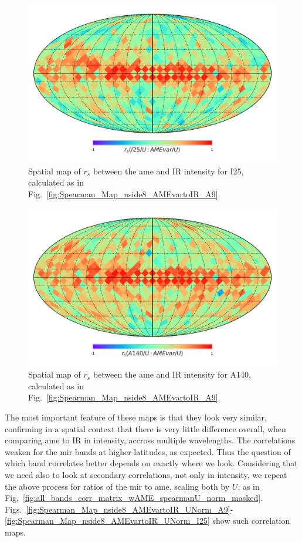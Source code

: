       \begin{figure}
        \includegraphics[width=\textwidth/2]{../Plots/Allsky_Corr/Spearman_Map_nside8_I25toAMEvar.pdf}
        \centering
        \caption{Spatial map of $r_{s}$ between the \gls{ame} and IR intensity for I25, calculated as in Fig.~\ref{fig:Spearman_Map_nside8_AMEvartoIR_A9}.}
        \label{fig:Spearman_Map_nside8_AMEvartoIR_I25}
      \end{figure}
      \begin{figure}
        \includegraphics[width=\textwidth/2]{../Plots/Allsky_Corr/Spearman_Map_nside8_A140toAMEvar.pdf}
        \centering
        \caption{Spatial map of $r_{s}$ between the \gls{ame} and IR intensity for A140, calculated as in Fig.~\ref{fig:Spearman_Map_nside8_AMEvartoIR_A9}.}
        \label{fig:Spearman_Map_nside8_AMEvartoIR_A140}
      \end{figure}
  The most important feature of these maps is that they look very similar, confirming in a spatial context that there is very little difference overall, when comparing \gls{ame} to IR in intensity, accross multiple wavelengths. The correlations weaken for the \gls{mir} bands at higher latitudes, as expected. Thus the question of which band correlates better depends on exactly where we look. Considering that we need also to look at secondary correlations, not only in intensity, we repeat the above process for ratios of the \gls{mir} to \gls{ame}, scaling both by $U$, as in Fig,~\ref{fig:all_bands_corr_matrix_wAME_spearmanU_norm_masked}.  Figs.~\ref{fig:Spearman_Map_nside8_AMEvartoIR_UNorm_A9}-\ref{fig:Spearman_Map_nside8_AMEvartoIR_UNorm_I25} show such correlation maps.
